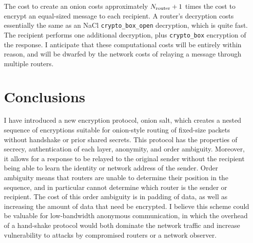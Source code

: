 \documentclass[letterpaper,twocolumn,amsmath,amssymb,pre,aps,10pt]{revtex4-1}
\begin{document}
The cost to create an onion costs approximately $N_{\text{router}}+1$ times the
cost to encrypt an equal-sized message to each recipient.  A router's
decryption costs essentially the same as an NaCl
\verb!crypto_box_open! decryption, which is quite fast.  The recipient
performs one additional decryption, plus \verb!crypto_box! encryption
of the response.  I anticipate that these computational costs will be
entirely within reason, and will be dwarfed by the network costs of
relaying a message through multiple routers.

\section{Conclusions}

I have introduced a new encryption protocol, onion salt, which creates
a nested sequence of encryptions suitable for onion-style routing of
fixed-size packets without handshake or prior shared secrets.  This
protocol has the properties of secrecy, authentication of each layer,
anonymity, and order ambiguity.  Moreover, it allows for a response to
be relayed to the original sender without the recipient being able to
learn the identity or network address of the sender.  Order ambiguity
means that routers are unable to determine their position in the
sequence, and in particular cannot determine which router is the
sender or recipient.  The cost of this order ambiguity is in padding
of data, as well as increasing the amount of data that need be
encrypted.  I believe this scheme could be valuable for low-bandwidth
anonymous communication, in which the overhead of a hand-shake
protocol would both dominate the network traffic and increase
vulnerability to attacks by compromised routers or a network observer.










\end{document}
